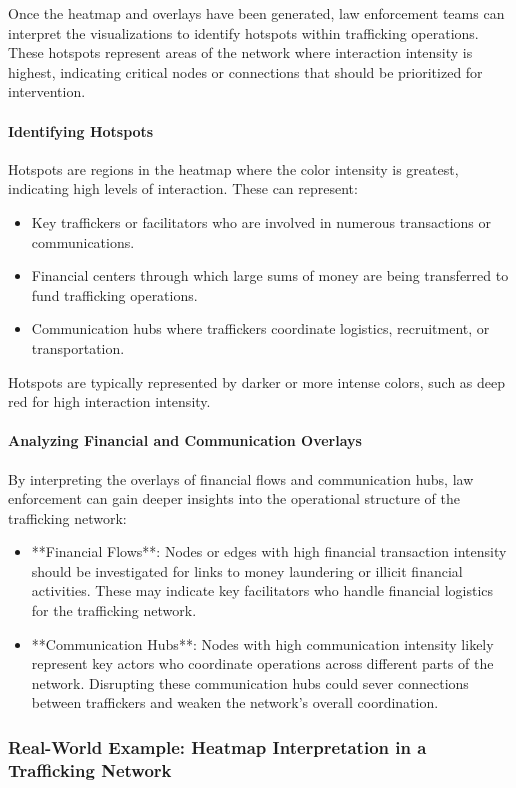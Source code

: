\documentclass[%
 preprint, linenumbers,
 amsmath,amssymb,
 aps, physrev,
]{revtex4-2}
\begin{document}
Once the heatmap and overlays have been generated, law enforcement teams can interpret the visualizations to identify hotspots within trafficking operations. These hotspots represent areas of the network where interaction intensity is highest, indicating critical nodes or connections that should be prioritized for intervention.

\paragraph{Identifying Hotspots}
Hotspots are regions in the heatmap where the color intensity is greatest, indicating high levels of interaction. These can represent:
\begin{itemize}
    \item Key traffickers or facilitators who are involved in numerous transactions or communications.
    \item Financial centers through which large sums of money are being transferred to fund trafficking operations.
    \item Communication hubs where traffickers coordinate logistics, recruitment, or transportation.
\end{itemize}
Hotspots are typically represented by darker or more intense colors, such as deep red for high interaction intensity.

\paragraph{Analyzing Financial and Communication Overlays}
By interpreting the overlays of financial flows and communication hubs, law enforcement can gain deeper insights into the operational structure of the trafficking network:
\begin{itemize}
    \item **Financial Flows**: Nodes or edges with high financial transaction intensity should be investigated for links to money laundering or illicit financial activities. These may indicate key facilitators who handle financial logistics for the trafficking network.
    \item **Communication Hubs**: Nodes with high communication intensity likely represent key actors who coordinate operations across different parts of the network. Disrupting these communication hubs could sever connections between traffickers and weaken the network's overall coordination.
\end{itemize}

\subsubsection{Real-World Example: Heatmap Interpretation in a Trafficking Network}
\end{document}
